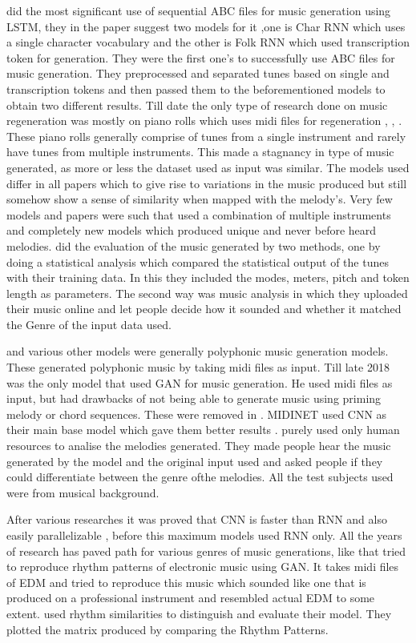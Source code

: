 \documentclass[oneside,12pt]{Classes/RoboticsLaTeX}
\begin{document}
\cite{abcmusic} did the most significant use of sequential ABC files for music generation using LSTM, they in the paper suggest two models for it ,one is Char RNN which uses a single character vocabulary and the other is Folk RNN which used transcription token for generation. They were the first one's to successfully use ABC files for music generation. They preprocessed and separated tunes based on single and transcription tokens and then passed them to the beforementioned models to obtain two different results. Till date the only type of research done on music regeneration was mostly on piano rolls which uses midi files for regeneration , \cite{midinet}, \cite{musegan}. These piano rolls generally comprise of tunes from a single instrument and rarely have tunes from multiple instruments. This made a stagnancy in type of music generated, as more or less the dataset used as input was similar. The models used differ in all papers which to give rise to variations in the music produced  but still somehow show a sense of similarity when mapped with the melody's. Very few models and papers were such that used a combination of multiple instruments and completely new models which produced unique and never before heard melodies. \cite{abcmusic} did the evaluation of the music generated by two methods, one by doing a statistical analysis which compared the statistical output of the tunes with their training data. In this they included the modes, meters, pitch and token length as parameters. The second way was music analysis in which they uploaded their music online and let people decide how it sounded and whether it matched the Genre of the input data used.

\cite{polygan} and various other models were generally polyphonic music generation models. These generated polyphonic music by taking midi files as input. Till late 2018 \cite{crnngan} was the only model that used GAN for music generation. He used midi files as input, but had drawbacks of not being able to generate music using priming melody or chord sequences. These were removed in \cite{midinet}. MIDINET used CNN as their main base model which gave them better results \cite{midinet}. \cite{midinet} purely used only human resources to analise the melodies generated. They made people hear the music generated by the model and the original input used and asked people if they could differentiate between the genre ofthe melodies. All the test subjects used were from musical background.

After various researches it was proved that CNN is faster than RNN and also easily parallelizable \cite{pxlcnn}, before this maximum models used RNN only. All the years of research has paved path for various genres of music generations, like \cite{edm} that tried to reproduce rhythm patterns of electronic music using GAN. It takes midi files of EDM and tried to reproduce this music which sounded like one that is produced on a professional instrument and resembled actual EDM to some extent. \cite{edm} used rhythm similarities to distinguish and evaluate their model. They plotted the matrix produced by comparing the Rhythm Patterns. 
\end{document}
